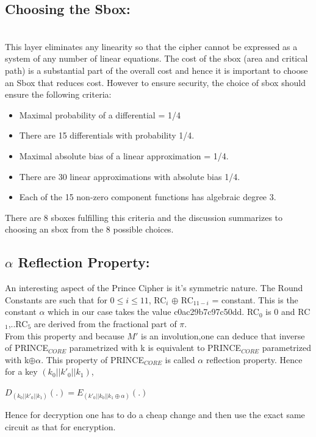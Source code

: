 \documentclass{transcrypto}
\begin{document}
\subsection{Choosing the Sbox:}\\
This layer eliminates any linearity so that the cipher cannot be expressed as a system of any number of linear equations. The cost of the sbox (area and critical path) is a substantial part of the overall cost and hence it is important to choose an Sbox that reduces cost. However to ensure security, the choice of sbox should ensure the following criteria:
\begin{itemize}
    \item Maximal probability of a differential = 1/4
\item There are 15 differentials with probability 1/4.
\item Maximal absolute bias of a linear approximation = 1/4.
\item There are 30 linear approximations with absolute bias 1/4.
\item Each of the 15 non-zero component functions has algebraic degree 3.
\end{itemize}
There are 8 sboxes fulfilling this criteria and the discussion summarizes to choosing an sbox from the 8 possible choices.\\
\subsection{$\alpha$ Reflection Property:}
An interesting aspect of the Prince Cipher is it's symmetric nature. The Round Constants are such that for $0\leq i \leq 11$, RC$_i$ $\oplus$ RC$_{11-i}$ = constant. This is the constant $\alpha$ which in our case takes the value c0ac29b7c97c50dd. RC$_0$ is 0 and RC$_1$,..RC$_5$ are derived from the fractional part of $\pi$.\\
From this property and because $M'$ is an involution,one can deduce that inverse of PRINCE$_{CORE}$ parametrized with k is equivalent to PRINCE$_{CORE}$ parametrized with k$\oplus\alpha$. This property of PRINCE$_{CORE}$ is called $\alpha$ reflection property. Hence for a key $(k_0||k'_0||k_1)$,
\begin{center}
    $D_{(k_0||k'_0||k_1)}(.)=E_{(k'_0||k_0||k_1\oplus\alpha)}(.)$
\end{center}
Hence for decryption one has to do a cheap change and then use the exact same circuit as that for encryption.
\end{document}

